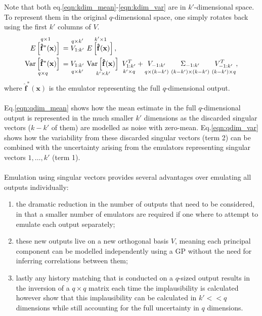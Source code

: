 \documentclass{article}
\newcommand{\numOutputs}{q}
\newcommand{\emulator}{\hat{f}}
\newcommand{\inputVec}{\mathbf{x}}
\newcommand{\RSingVecs}{V}
\newcommand{\basis}{V}
\newcommand{\singValMat}{\Sigma}
\newcommand{\matRank}{k}
\begin{document}
Note that both eq.\eqref{eqn:kdim_mean}-\eqref{eqn:kdim_var} are in $\matRank'$-dimensional space. To represent them in the original $\numOutputs$-dimensional space, one simply rotates back using the first $\matRank'$ columns of $\RSingVecs$.
\begin{align}
    \overset{\numOutputs \times 1}{E\left[\mathbf{\emulator}^*(\inputVec) \right] \strut}&= \overset{\numOutputs \times \matRank'}{\RSingVecs_{1:\matRank'}\strut} \ \overset{\matRank' \times 1}{E\left[\mathbf{\emulator}(\inputVec)\right] \strut},\label{eqn:qdim_mean}\\
    \underset{\numOutputs \times \numOutputs}{\text{Var}\left[\mathbf{\emulator}^*(\inputVec) \right]\strut} &= \underset{\numOutputs \times \matRank'}{\RSingVecs_{1:\matRank'}\strut} \ \underset{\matRank' \times \matRank'}{\text{Var}\left[\mathbf{\emulator}(\inputVec)\right]\strut} \ \underset{\matRank' \times \numOutputs}{\RSingVecs_{1:\matRank'}^T\strut} + \underset{\numOutputs \times (\matRank-\matRank')}{\RSingVecs_{-1:\matRank'}\strut} \ \underset{(\matRank-\matRank')\times(\matRank-\matRank')}{\singValMat_{-1:\matRank'}\strut} \ \underset{(\matRank-\matRank') \times \numOutputs}{\RSingVecs_{-1:\matRank'}^T\strut}, \label{eqn:qdim_var}
\end{align}
where $\mathbf{\emulator}^*(\inputVec)$ is the emulator representing the full $\numOutputs$-dimensional output.\\\\
Eq.\eqref{eqn:qdim_mean} shows how the mean estimate in the full $\numOutputs$-dimensional output is represented in the much smaller $\matRank'$ dimensions as the discarded singular vectors ($\matRank-\matRank'$ of them) are modelled as noise with zero-mean. Eq.\eqref{eqn:qdim_var} shows how the variability from these discarded singular vectors (term 2) can be combined with the uncertainty arising from the emulators representing singular vectors $1,\dots,\matRank'$ (term 1).\\\\
Emulation using singular vectors provides several advantages over emulating all outputs individually:
\begin{enumerate}
    \item the dramatic reduction in the number of outputs that need to be considered, in that a smaller number of emulators are required if one where to attempt to emulate each output separately;

    \item these new outputs live on a new orthogonal basis $\basis$, meaning each principal component can be modelled independently using a GP \citep{Higdon2008} without the need for inferring correlations between them;

    \item lastly any history matching that is conducted on a $\numOutputs$-sized output results in the inversion of a $\numOutputs \times \numOutputs$ matrix each time the implausibility is calculated however \citet{Salter2022} show that this implausibility can be calculated in $\matRank' << \numOutputs$ dimensions while still accounting for the full uncertainty in $\numOutputs$ dimensions.
\end{enumerate}
\end{document}
